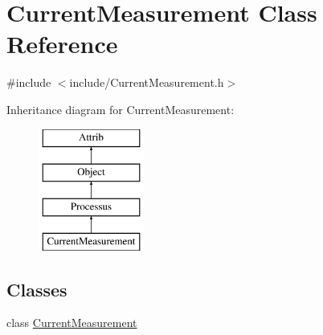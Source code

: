 \hypertarget{classCurrentMeasurement}{}\section{Current\+Measurement Class Reference}
\label{classCurrentMeasurement}


{\ttfamily \#include $<$include/\+Current\+Measurement.\+h$>$}

Inheritance diagram for Current\+Measurement\+:\begin{figure}[H]
\begin{center}
\leavevmode
\includegraphics[height=4.000000cm]{classCurrentMeasurement}
\end{center}
\end{figure}
\subsection*{Classes}
\begin{DoxyCompactItemize}
\item 
class \hyperlink{classCurrentMeasurement_1_1CurrentMeasurement}{Current\+Measurement}
\end{DoxyCompactItemize}
